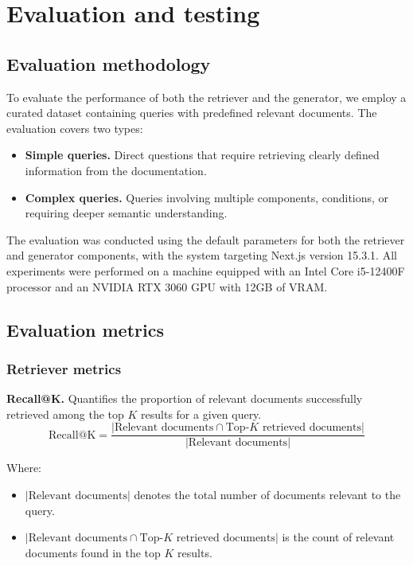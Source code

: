 \chapter{Evaluation and testing}

\section{Evaluation methodology}

To evaluate the performance of both the retriever and the generator, we employ a curated dataset containing queries with predefined relevant documents. The evaluation covers two types:

\begin{itemize} 
	\item \textbf{Simple queries.} Direct questions that require retrieving clearly defined information from the documentation. 
	\item \textbf{Complex queries.} Queries involving multiple components, conditions, or requiring deeper semantic understanding.
\end{itemize}

The evaluation was conducted using the default parameters for both the retriever and generator components, with the system targeting Next.js version 15.3.1. All experiments were performed on a machine equipped with an Intel Core i5-12400F processor and an NVIDIA RTX 3060 GPU with 12GB of VRAM.

\section{Evaluation metrics}

	\subsection{Retriever metrics}
	\noindent\textbf{Recall@K.}  Quantifies the proportion of relevant documents successfully retrieved among the top $K$ results for a given query.
	\[
	\text{Recall@K} = \frac{| \text{Relevant documents} \cap \text{Top-}K \text{ retrieved documents} |}{|\text{Relevant documents}|}
	\]
	
	Where:
	\begin{itemize}
		\item $|\text{Relevant documents}|$ denotes the total number of documents relevant to the query.
		\item $|\text{Relevant documents} \cap \text{Top-}K \text{ retrieved documents}|$ is the count of relevant documents found in the top $K$ results.
	\end{itemize}
	

